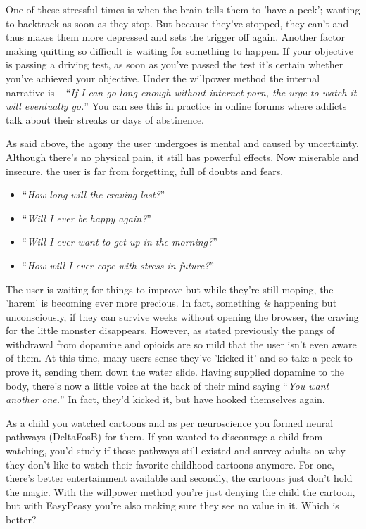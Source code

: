 \documentclass[
]{book}
\begin{document}
One of these stressful times is when the brain tells them to 'have a peek'; wanting to backtrack as soon as they stop. But because they've stopped, they can't and thus makes them more depressed and sets the trigger off again. Another factor making quitting so difficult is waiting for something to happen. If your objective is passing a driving test, as soon as you've passed the test it's certain whether you've achieved your objective. Under the willpower method the internal narrative is -- ``\emph{If I can go long enough without internet porn, the urge to watch it will eventually go.}'' You can see this in practice in online forums where addicts talk about their streaks or days of abstinence.

As said above, the agony the user undergoes is mental and caused by uncertainty. Although there's no physical pain, it still has powerful effects. Now miserable and insecure, the user is far from forgetting, full of doubts and fears.

\begin{itemize}
\item
  ``\emph{How long will the craving last?}''
\item
  ``\emph{Will I ever be happy again?}''
\item
  ``\emph{Will I ever want to get up in the morning?}''
\item
  ``\emph{How will I ever cope with stress in future?}''
\end{itemize}

The user is waiting for things to improve but while they're still moping, the 'harem' is becoming ever more precious. In fact, something \emph{is} happening but unconsciously, if they can survive weeks without opening the browser, the craving for the little monster disappears. However, as stated previously the pangs of withdrawal from dopamine and opioids are so mild that the user isn't even aware of them. At this time, many users sense they've 'kicked it' and so take a peek to prove it, sending them down the water slide. Having supplied dopamine to the body, there's now a little voice at the back of their mind saying ``\emph{You want another one.}'' In fact, they'd kicked it, but have hooked themselves again.

As a child you watched cartoons and as per neuroscience you formed neural pathways (DeltaFosB) for them. If you wanted to discourage a child from watching, you'd study if those pathways still existed and survey adults on why they don't like to watch their favorite childhood cartoons anymore. For one, there's better entertainment available and secondly, the cartoons just don't hold the magic. With the willpower method you're just denying the child the cartoon, but with EasyPeasy you're also making sure they see no value in it. Which is better?
\end{document}
